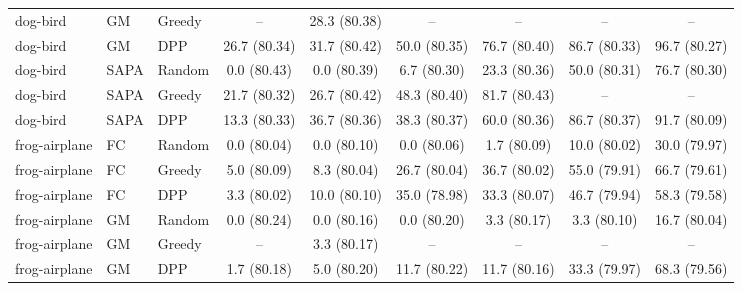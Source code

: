 \begin{table}[h]
{\begin{tabular}{lllcccccc}
dog-bird & GM & Greedy
& --
& 28.3 \small{(80.38)}
& --
& --
& --
& -- \\

dog-bird & GM & DPP
& 26.7 \small{(80.34)}
& 31.7 \small{(80.42)}
& 50.0 \small{(80.35)}
& 76.7 \small{(80.40)}
& 86.7 \small{(80.33)}
& 96.7 \small{(80.27)} \\



dog-bird & SAPA & Random
& 0.0 \small{(80.43)}
& 0.0 \small{(80.39)}
& 6.7 \small{(80.30)}
& 23.3 \small{(80.36)}
& 50.0 \small{(80.31)}
& 76.7 \small{(80.30)} \\

dog-bird & SAPA & Greedy
& 21.7 \small{(80.32)}
& 26.7 \small{(80.42)}
& 48.3 \small{(80.40)}
& 81.7 \small{(80.43)}
& --
& -- \\

dog-bird & SAPA & DPP
& 13.3 \small{(80.33)}
& 36.7 \small{(80.36)}
& 38.3 \small{(80.37)}
& 60.0 \small{(80.36)}
& 86.7 \small{(80.37)}
& 91.7 \small{(80.09)} \\



frog-airplane & FC & Random
& 0.0 \small{(80.04)}
& 0.0 \small{(80.10)}
& 0.0 \small{(80.06)}
& 1.7 \small{(80.09)}
& 10.0 \small{(80.02)}
& 30.0 \small{(79.97)} \\

frog-airplane & FC & Greedy
& 5.0 \small{(80.09)}
& 8.3 \small{(80.04)}
& 26.7 \small{(80.04)}
& 36.7 \small{(80.02)}
& 55.0 \small{(79.91)}
& 66.7 \small{(79.61)} \\

frog-airplane & FC & DPP
& 3.3 \small{(80.02)}
& 10.0 \small{(80.10)}
& 35.0 \small{(78.98)}
& 33.3 \small{(80.07)}
& 46.7 \small{(79.94)}
& 58.3 \small{(79.58)} \\



frog-airplane & GM & Random
& 0.0 \small{(80.24)}
& 0.0 \small{(80.16)}
& 0.0 \small{(80.20)}
& 3.3 \small{(80.17)}
& 3.3 \small{(80.10)}
& 16.7 \small{(80.04)} \\

frog-airplane & GM & Greedy
& --
& 3.3 \small{(80.17)}
& --
& --
& --
& -- \\

frog-airplane & GM & DPP
& 1.7 \small{(80.18)}
& 5.0 \small{(80.20)}
& 11.7 \small{(80.22)}
& 11.7 \small{(80.16)}
& 33.3 \small{(79.97)}
& 68.3 \small{(79.56)} \\




\end{tabular}}
\end{table}
